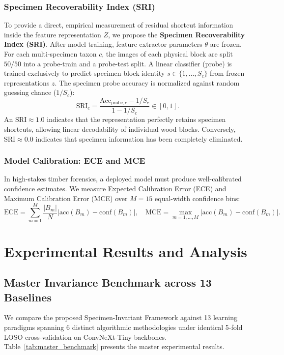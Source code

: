 \documentclass[a4paper,fleqn]{cas-sc}
\begin{document}
\subsubsection{Specimen Recoverability Index (SRI)}
To provide a direct, empirical measurement of residual shortcut information inside the feature representation $Z$, we propose the \textbf{Specimen Recoverability Index (SRI)}. 
After model training, feature extractor parameters $\theta$ are frozen. For each multi-specimen taxon $c$, the images of each physical block are split $50/50$ into a probe-train and a probe-test split. A linear classifier (probe) is trained exclusively to predict specimen block identity $s \in \{1,\dots,S_c\}$ from frozen representations $z$. The specimen probe accuracy is normalized against random guessing chance ($1 / S_c$):
\begin{equation}
    \mathrm{SRI}_c = \frac{\mathrm{Acc}_{\text{probe}, c} - 1/S_c}{1 - 1/S_c} \in [0, 1].
    \label{eq:sri}
\end{equation}
An $\mathrm{SRI} \approx 1.0$ indicates that the representation perfectly retains specimen shortcuts, allowing linear decodability of individual wood blocks. Conversely, $\mathrm{SRI} \approx 0.0$ indicates that specimen information has been completely eliminated.

\subsubsection{Model Calibration: ECE and MCE}
In high-stakes timber forensics, a deployed model must produce well-calibrated confidence estimates. We measure Expected Calibration Error (ECE) and Maximum Calibration Error (MCE) over $M=15$ equal-width confidence bins:
\begin{equation}
    \mathrm{ECE} = \sum_{m=1}^M \frac{|B_m|}{N} \left| \mathrm{acc}(B_m) - \mathrm{conf}(B_m) \right|, \quad \mathrm{MCE} = \max_{m=1,\dots,M} \left| \mathrm{acc}(B_m) - \mathrm{conf}(B_m) \right|.
    \label{eq:ece}
\end{equation}

\section{Experimental Results and Analysis}
\label{sec:experiments}

\subsection{Master Invariance Benchmark across 13 Baselines}
We compare the proposed Specimen-Invariant Framework against 13 learning paradigms spanning 6 distinct algorithmic methodologies under identical 5-fold LOSO cross-validation on ConvNeXt-Tiny backbones. Table~\ref{tab:master_benchmark} presents the master experimental results.
\end{document}

